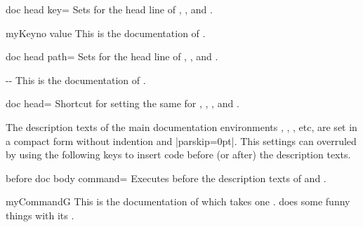 \begin{docTcbKey}{doc head key}{=}{\tcbdocdescInitEmpty}
  Sets  for the head line of
  , , and .
\begin{dispExample}

\begin{docKey}[foo]{myKey}{}{no value}
  This is the documentation of .
\end{docKey}
\end{dispExample}
\end{docTcbKey}


\begin{docTcbKey}[][doc new=2019-09-18]{doc head path}{=}{\tcbdocdescInitEmpty}
  Sets  for the head line of
  , , and .
\begin{dispExample}

\begin{docPathOperation*}{-{}-}{}
  This is the documentation of .
\end{docPathOperation*}
\end{dispExample}
\end{docTcbKey}


\begin{docTcbKey}[][doc updated=2019-09-18]{doc head}{=}{\tcbdocdescInitEmpty}
  Shortcut for setting the same  for
  , ,
  , and .
\end{docTcbKey}


\clearpage

The description texts of the main documentation environments ,
, , etc, are set in a compact form without
indention and |parskip=0pt|. This settings can overruled by using the following
keys to insert code before (or after) the description texts.

\begin{docTcbKey}[][doc new=2015-10-09]{before doc body command}{=}{\tcbdocdescInitEmpty}
  Executes  before the description texts
  of  and .
\begin{dispExample}

\begin{docCommand*}{myCommandG}{}
  This is the documentation of  which takes one .
   does some funny things with its .
\end{docCommand*}
\end{dispExample}
\end{docTcbKey}



